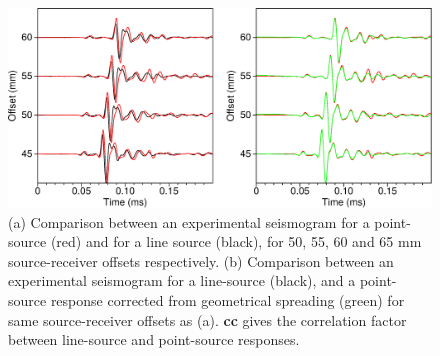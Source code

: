 \documentclass[manuscript,revised]{geophysics}
\begin{document}
\begin{figure}[!h]
	\centering
	\includegraphics[scale=0.5]{fig/trans2d3d-musc.eps}
	\caption{(a) Comparison between an experimental seismogram for a point-source (red) and for a line source (black), for 50, 55, 60 and 65 mm source-receiver offsets respectively. (b) Comparison between an experimental seismogram for a line-source (black), and a point-source response corrected from geometrical spreading (green) for same source-receiver offsets as (a). \textbf{cc} gives the correlation factor between line-source and point-source responses.}
	\label{panel_amplitude}
\end{figure}


%
\end{document}
